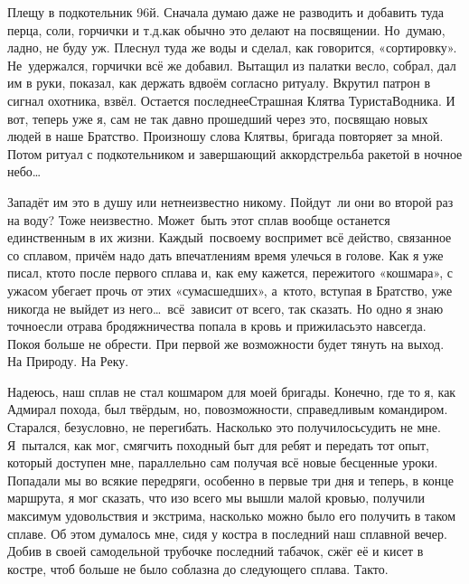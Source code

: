 Плещу в подкотельник 96\sdash й. Сначала думаю даже не разводить и добавить туда перца, соли, горчички и т.д.\mdash как обычно это делают на посвящении. Но~думаю, ладно, не буду уж. Плеснул туда же воды и сделал, как говорится, «сортировку». Не~удержался, горчички всё же добавил. Вытащил из палатки весло, собрал, дал им в руки, показал, как держать вдвоём согласно ритуалу. Вкрутил патрон в сигнал охотника, взвёл. Остается последнее\mdash Страшная Клятва Туриста\sdash Водника. И вот, теперь уже я, сам не так давно прошедший через это, посвящаю новых людей в наше Братство. Произношу слова Клятвы, бригада повторяет за мной. Потом ритуал с подкотельником и завершающий аккорд\mdash стрельба ракетой в ночное небо\ldots~   

Западёт им это в душу или нет\mdash неизвестно никому. Пойдут~ли они во второй раз на воду? Тоже неизвестно. Может~быть этот сплав вообще останется единственным в их жизни. Каждый~по\sdash своему воспримет всё действо, связанное со сплавом, причём надо дать впечатлениям время улечься в голове. Как я уже писал, кто\sdash то после первого сплава и, как ему кажется, пережитого «кошмара», с ужасом убегает прочь от этих «сумасшедших», а~кто\sdash то, вступая в Братство, уже никогда не выйдет из него\ldots~всё~зависит от всего, так сказать. Но одно я знаю точно\mdash если отрава бродяжничества попала в кровь и прижилась\mdash это навсегда. Покоя больше не обрести. При первой же возможности будет тянуть на выход. На Природу. На Реку.

Надеюсь, наш сплав не стал кошмаром для моей бригады. Конечно, где то я, как Адмирал похода, был твёрдым, но, по\sdash возможности, справедливым командиром. Старался, безусловно, не перегибать. Насколько это получилось\mdash судить не мне. Я~пытался, как мог, смягчить походный быт для ребят и передать тот опыт, который доступен мне, параллельно сам получая всё новые бесценные уроки. Попадали мы во всякие передряги, особенно в первые три дня и теперь, в конце маршрута, я мог сказать, что изо всего мы вышли малой кровью, получили максимум удовольствия и экстрима, насколько можно было его получить в таком сплаве. Об этом думалось мне, сидя у костра в последний наш сплавной вечер. Добив в своей самодельной трубочке последний табачок, сжёг её и кисет в костре, чтоб больше не было соблазна до следующего сплава. Так\sdash то. 

\begin{center}
\end{center}